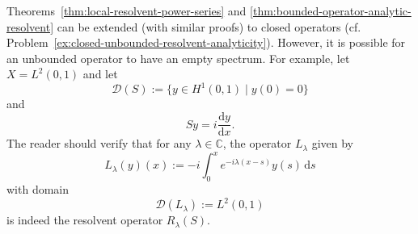 \begingroup
{}
\renewcommand{\endProof}{\par\nobreak\hfill$\blacksquare$\par\vspace{0.1cm}}
\endgroup

\begin{Remark}
\label{rem:unbounded-operator-empty-spectrum-example}
Theorems~\ref{thm:local-resolvent-power-series} and \ref{thm:bounded-operator-analytic-resolvent} can be extended (with similar proofs) to closed operators (cf. Problem~\ref{ex:closed-unbounded-resolvent-analyticity}). However, it is possible for an unbounded operator to have an empty spectrum. For example, let $X=L^2(0,1)$ and let
\begin{equation}\label{eq:empty-spectrum-derivative-domain}
\mathcal{D}(S):=\{y\in H^1(0,1)\mid y(0)=0\}
\end{equation}
and
\begin{equation}\label{eq:empty-spectrum-derivative-action}
Sy=i\dfrac{\mathrm{d}y}{\mathrm{d}x}.
\end{equation}
The reader should verify that for any $\lambda\in\mathbb{C}$, the operator $L_\lambda$ given by
\begin{equation}\label{eq:empty-spectrum-derivative-explicit-resolvent}
L_\lambda(y)(x):=-i\int_0^xe^{-i\lambda(x-s)}y(s)\,\mathrm{d}s
\end{equation}
with domain
\begin{equation}\label{eq:empty-spectrum-derivative-resolvent-domain}
\mathcal{D}(L_\lambda):=L^2(0,1)
\end{equation}
is indeed the resolvent operator $R_\lambda(S)$.
\end{Remark}

